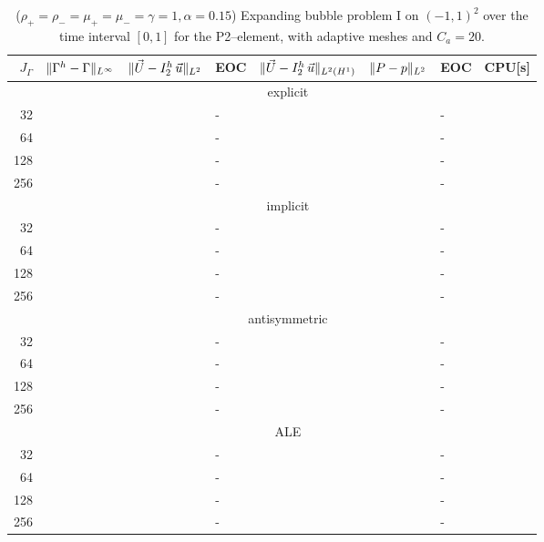 \begin{table}
\center
\hspace*{-3.25cm}
\begin{tabular}{rllllllr}
\hline
$J_\Gamma$ & $\|\Gamma^h - \Gamma\|_{L^\infty}$ & $\|\vec U - I^h_{2}\,\vec u\|_{L^2}$ & EOC & $\|\vec U - I^h_{2}\,\vec u\|_{L^2(H^1)}$ & $\|P - p\|_{L^2}$ & EOC
& CPU[s] \\
\hline
& \multicolumn{7}{c}{explicit} \\
\hline
 32 & & & - & & & - & \\
 64 & & & - & & & - & \\
128 & & & - & & & - & \\
256 & & & - & & & - & \\
\hline
& \multicolumn{7}{c}{implicit} \\
\hline
 32 & & & - & & & - & \\
 64 & & & - & & & - & \\
128 & & & - & & & - & \\
256 & & & - & & & - & \\
\hline
& \multicolumn{7}{c}{antisymmetric} \\
\hline
 32 & & & - & & & - & \\
 64 & & & - & & & - & \\
128 & & & - & & & - & \\
256 & & & - & & & - & \\
\hline
& \multicolumn{7}{c}{ALE} \\
\hline
 32 & & & - & & & - & \\
 64 & & & - & & & - & \\
128 & & & - & & & - & \\
256 & & & - & & & - & \\
\hline
\end{tabular}
\hspace*{-3.25cm}
\caption[Navier--Stokes expanding bubble I errors P2--\pdg]
{($\rho_+ = \rho_- = \mu_+ = \mu_- = \gamma = 1,\alpha=0.15$)
Expanding bubble problem I on $(-1,1)^2$ over the time interval $[0,1]$ for the
P2--\pdg element, with adaptive meshes and $C_a=20$\textdegree.}
\label{tab:nsexpandingbubbleIp2p1dg}
\end{table}

